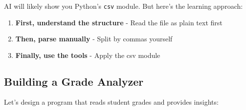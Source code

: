 \documentclass[
  letterpaper,
  DIV=11,
  numbers=noendperiod,
  oneside]{scrreprt}
\providecommand{\tightlist}{%
  \setlength{\itemsep}{0pt}\setlength{\parskip}{0pt}}\usepackage{longtable,booktabs,array}
\begin{document}
AI will likely show you Python's \texttt{csv} module. But here's the
learning approach:

\begin{enumerate}
\def\labelenumi{\arabic{enumi}.}
\tightlist
\item
  \textbf{First, understand the structure} - Read the file as plain text
  first
\item
  \textbf{Then, parse manually} - Split by commas yourself\\
\item
  \textbf{Finally, use the tools} - Apply the csv module
\end{enumerate}

\subsection{Building a Grade Analyzer}\label{building-a-grade-analyzer}

Let's design a program that reads student grades and provides insights:
\end{document}

